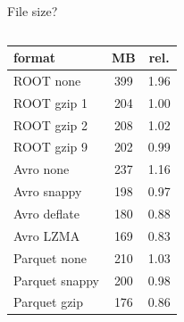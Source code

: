 \documentclass{beamer}
\begin{document}
\begin{frame}{File size?}
\begin{columns}
\begin{column}{0.5\linewidth}
\begin{onlyenv}
\begin{center}
\vspace{0.5 cm}
\small
\begin{tabular}{l c c}
format         & MB  & rel. \\\hline
ROOT none      & 399 & 1.96 \\
ROOT gzip 1    & 204 & 1.00 \\
ROOT gzip 2    & 208 & 1.02 \\
ROOT gzip 9    & 202 & 0.99 \\\hline
Avro none      & 237 & 1.16 \\
Avro snappy    & 198 & 0.97 \\
Avro deflate   & 180 & 0.88 \\
Avro LZMA      & 169 & 0.83 \\\hline
Parquet none   & 210 & 1.03 \\
Parquet snappy & 200 & 0.98 \\
Parquet gzip   & 176 & 0.86 \\
\end{tabular}
\end{center}
\end{onlyenv}
\end{column}
\end{columns}
\end{frame}
\end{document}
